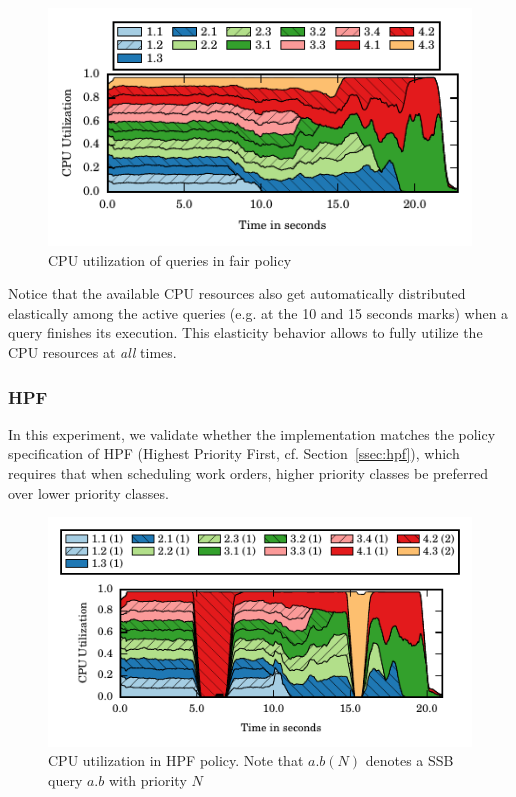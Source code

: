 \begin{figure}[]
	\centering
	\includegraphics[width=\columnwidth]{figures/ssb-all-uniform-fair-cpu-util.pdf}
	\vspace{-2.5em}
	\caption{CPU utilization of queries in fair policy}
	\label{fig:fair-cpu-util}
\end{figure}

Notice that the available CPU resources also get automatically distributed elastically among the active queries (e.g. at the 10 and 15 seconds marks) when a query finishes its execution. 
This elasticity behavior allows \sys{} to fully utilize the CPU resources at \textit{all} times.
\subsubsection{HPF}
In this experiment, we validate whether the implementation matches the policy 
specification of HPF (Highest Priority First, cf. Section~\ref{ssec:hpf}),
which requires that when scheduling work orders, higher priority classes be 
preferred over lower priority classes. 

\begin{figure}[b]
	\centering
	\includegraphics[width=\columnwidth]{figures/ssb-hpf-all.pdf}
	\vspace{-2.5em}
	\caption{CPU utilization in HPF policy. Note that $a.b  (N)$ denotes a SSB query $a.b$ with priority $N$}
	\vspace{-1em}
	\label{fig:hpf-all}
\end{figure}

